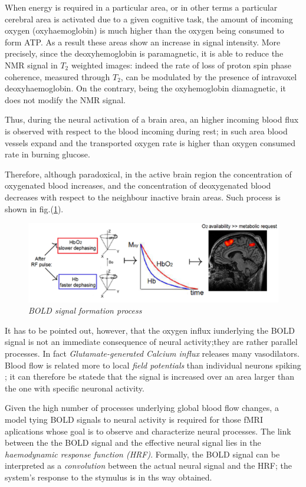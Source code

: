 \documentclass[12pt,openright,twoside,a4paper]{book}
\begin{document}
When energy is required in a particular area, or in other terms a particular cerebral area is activated due to a given cognitive task, the amount of incoming oxygen (oxyhaemoglobin) is much higher than the oxygen being consumed to form ATP. 
As a result these areas show an increase in signal intensity.
More precisely, since the deoxyhemoglobin is paramagnetic, it is able to reduce the NMR signal in $T_2$ weighted images: indeed the rate of loss of proton spin phase coherence, measured through $T_2$, can be modulated by the presence of intravoxel deoxyhaemoglobin. On the contrary, being the oxyhemoglobin diamagnetic, it does not modify the NMR signal.

Thus, during the neural activation of a brain area, an higher incoming blood flux is observed with respect to the blood incoming during rest; in such area blood vessels expand and the transported oxygen rate is higher than oxygen consumed rate in burning glucose. 

Therefore, although paradoxical, in the active brain region the concentration of oxygenated blood increases, and the concentration of deoxygenated blood decreases with respect to the neighbour inactive brain areas. Such process is shown in fig.(\ref{bold}).

\begin{figure}[!h]
\centering
\includegraphics[scale=0.75]{bold}
\caption{\textit{BOLD signal formation process}}
\label{bold}
\end{figure}

It has to be pointed out, however, that the oxygen influx iunderlying the BOLD signal is not an immediate consequence of neural activity;they are rather parallel processes. 
In fact \textit{Glutamate-generated Calcium influx} releases many vasodilators. 
Blood flow is related more to local \textit{field potentials} than individual neurons spiking \cite{bold}; it can therefore be statede that the signal is increased over an area larger than the one with specific neuronal activity.

Given the high number of processes underlying global blood flow changes, a model tying BOLD signals to neural activity is required for those fMRI aplications whose goal is to observe and characterize neural processes.
The link between the the BOLD signal and the effective neural signal lies in the \textit{haemodynamic response function (HRF)}.
Formally, the BOLD signal can be interpreted as a \textit{convolution} between the actual neural signal and the HRF; the system's response to the stymulus is in ths way obtained.
\end{document}
